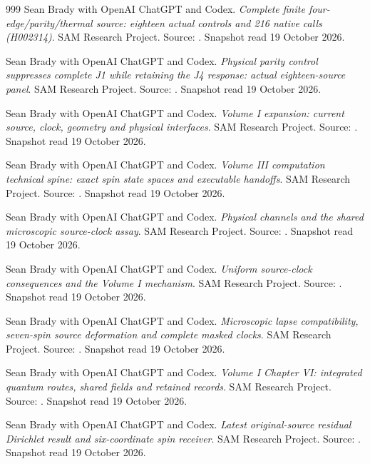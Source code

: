 \begin{thebibliography}{999}
 Sean Brady with OpenAI ChatGPT and Codex. \emph{Complete finite four-edge/parity/thermal source: eighteen actual controls and 216 native calls (H002314)}. SAM Research Project. Source: . Snapshot read 19 October 2026.

 Sean Brady with OpenAI ChatGPT and Codex. \emph{Physical parity control suppresses complete J1 while retaining the J4 response: actual eighteen-source panel}. SAM Research Project. Source: . Snapshot read 19 October 2026.

 Sean Brady with OpenAI ChatGPT and Codex. \emph{Volume I expansion: current source, clock, geometry and physical interfaces}. SAM Research Project. Source: . Snapshot read 19 October 2026.

 Sean Brady with OpenAI ChatGPT and Codex. \emph{Volume III computation technical spine: exact spin state spaces and executable handoffs}. SAM Research Project. Source: . Snapshot read 19 October 2026.

 Sean Brady with OpenAI ChatGPT and Codex. \emph{Physical channels and the shared microscopic source-clock assay}. SAM Research Project. Source: . Snapshot read 19 October 2026.

 Sean Brady with OpenAI ChatGPT and Codex. \emph{Uniform source-clock consequences and the Volume I mechanism}. SAM Research Project. Source: . Snapshot read 19 October 2026.

 Sean Brady with OpenAI ChatGPT and Codex. \emph{Microscopic lapse compatibility, seven-spin source deformation and complete masked clocks}. SAM Research Project. Source: . Snapshot read 19 October 2026.

 Sean Brady with OpenAI ChatGPT and Codex. \emph{Volume I Chapter VI: integrated quantum routes, shared fields and retained records}. SAM Research Project. Source: . Snapshot read 19 October 2026.

 Sean Brady with OpenAI ChatGPT and Codex. \emph{Latest original-source residual Dirichlet result and six-coordinate spin receiver}. SAM Research Project. Source: . Snapshot read 19 October 2026.


\end{thebibliography}
